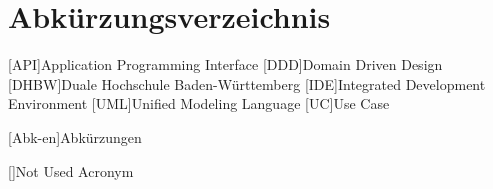 %                                              
%

\chapter*{Abkürzungsverzeichnis} %

\begin{acronym}[12345678910]
  	[API]{Application Programming Interface}
  	[DDD]{Domain Driven Design}
	[DHBW]{Duale Hochschule Baden-Württemberg}
	[IDE]{Integrated Development Environment}
	[UML]{Unified Modeling Language}
	[UC]{Use Case}


	[Abk-en]{Abkürzungen}

	[]{Not Used Acronym}
	
\end{acronym}
